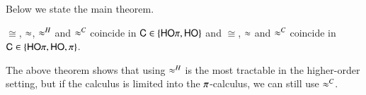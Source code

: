 \smallskip 

Below we state the main theorem.

\smallskip 

\begin{theorem}[Coincidence]\rm
	\label{the:coincidence}
$\cong$, $\approx$, $\approx^H$ and $\approx^C$ coincide in $\mathsf{C}\in \{\mathsf{HO}\pi, \mathsf{HO}\}$
and 
$\cong$, $\approx$ and $\approx^C$ coincide in $\mathsf{C}\in \{\mathsf{HO}\pi, \mathsf{HO}, \pi\}$. 
\end{theorem}
The above theorem shows that using $\approx^H$ is the most tractable 
in the higher-order setting, but if the calculus is limited into the 
$\pi$-calculus, we can still use $\approx^C$. 


\smallskip 












